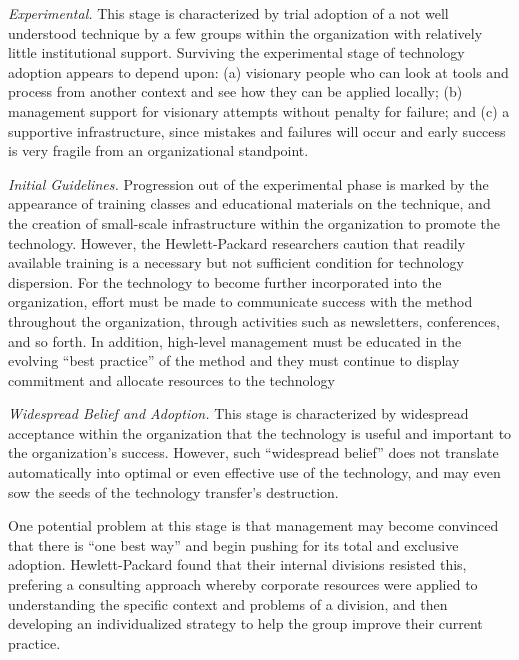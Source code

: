 \begin{itemizenoindent}
\item {\em Experimental.}  This stage is characterized by trial adoption
  of a not well understood technique by a few groups within the
  organization with relatively little institutional support.  Surviving
  the experimental stage of technology adoption appears to depend upon:
  (a) visionary people who can look at tools and process from another
  context and see how they can be applied locally; (b) management support
  for visionary attempts without penalty for failure; and (c) a
  supportive infrastructure, since mistakes and failures will occur and
  early success is very fragile from an organizational standpoint.

\item {\em Initial Guidelines.}  Progression out of the experimental
  phase is marked by the appearance of training classes and educational
  materials on the technique, and the creation of small-scale
  infrastructure within the organization to promote the technology.
  However, the Hewlett-Packard researchers caution that readily available training is
  a necessary but not sufficient condition for technology dispersion.
  For the technology to become further incorporated into the
  organization, effort must be made to communicate success with the
  method throughout the organization, through activities such as
  newsletters, conferences, and so forth. In addition, high-level
  management must be educated in the evolving ``best practice'' of the
  method and they must continue to display commitment and allocate
  resources to the technology

\item {\em Widespread Belief and Adoption.} This stage is characterized
  by widespread acceptance within the organization that the technology is
  useful and important to the organization's success.  However, such
  ``widespread belief'' does not translate automatically into optimal or
  even effective use of the technology, and may even sow the seeds of the
  technology transfer's destruction. 

  One potential problem at this stage is that management may become
  convinced that there is ``one best way'' and begin pushing for its
  total and exclusive adoption.  Hewlett-Packard found that their internal divisions
  resisted this, prefering a consulting approach whereby corporate
  resources were applied to understanding the specific context and
  problems of a division, and then developing an individualized strategy
  to help the group improve their current practice.


\end{itemizenoindent}
